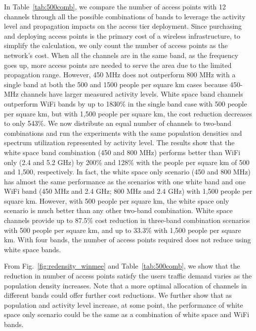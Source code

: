 In Table~\ref{tab:500comb}, we compare the number of access points with 12 channels through all 
the possible combinations of bands to leverage the activity level and propagation impacts on the 
access tier deployment. 
Since purchasing and deploying access points is the primary cost of a wireless 
infrastructure, to simplify the calculation, we only count the number of access points as 
the network's cost. 
When all the channels are in the same band, as the frequency goes up, more access 
points are needed to serve the area due to the limited propagation range. However,
450 MHz does not outperform 800 MHz with a single band at both the 500 and 1500 people per
square km cases because 450-MHz channels have larger measured activity levels. 
White space band channels outperform WiFi bands by up to 1830\% in the single band case
with 500 people per square km, but with 1,500 people per square km, the cost reduction
decreases to only 543\%.
We now distribute an equal number of channels to two-band combinations and run the experiments 
with the same population densities and spectrum utilization represented by activity level. 
The results show that the white space band
combination (450 and 800 MHz) performs better than WiFi only (2.4 and 5.2 GHz) by 200\% and
128\% with the people per square km of 500 and 1,500, respectively. In fact, the white space only
scenario (450 and 800 MHz) has almost the same performance as the scenarios with one white band and
one WiFi band (450 MHz and 2.4 GHz; 800 MHz and 2.4 GHz) with 1,500 people per square km.
However, with 500 people per square km, the white space only scenario is much better than any other two-band combination.
White space channels provide up to 87.5\% cost reduction in three-band combination scenarios with
500 people per square km, and up to 33.3\% with 1,500 people per square km.  With four bands,
the number of access points required does not reduce using white space bands.

From Fig.~\ref{fig:redensity_winmee} and Table~\ref{tab:500comb}, we show that 
the reduction in number of access points satisfy the users traffic demand varies 
as the population density increases. Note that a more optimal allocation of channels in different bands could offer
further cost reductions. We further show that as population and activity level increase, 
at some point, the performance of white space only scenario could be the same as a combination of
white space and WiFi bands. 

